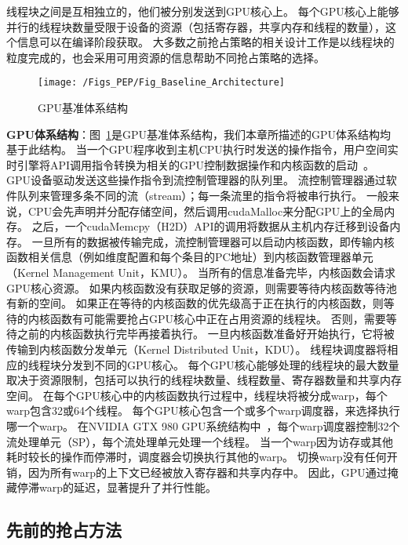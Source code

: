 线程块之间是互相独立的，他们被分别发送到GPU核心上。
每个GPU核心上能够并行的线程块数量受限于设备的资源（包括寄存器，共享内存和线程的数量），这个信息可以在编译阶段获取。
大多数之前抢占策略的相关设计工作是以线程块的粒度完成的，也会采用可用资源的信息帮助不同抢占策略的选择。


\begin{figure}[htbp] %
  \centering
  \texttt{[image: /Figs\_PEP/Fig\_Baseline\_Architecture]}
  \caption{GPU基准体系结构}
  \label{fig:Fig_Baseline_Architecture}
\end{figure}


\textbf{GPU体系结构}：图~\ref{fig:Fig_Baseline_Architecture}是GPU基准体系结构，我们本章所描述的GPU体系结构均基于此结构。
当一个GPU程序收到主机CPU执行时发送的操作指令，用户空间实时引擎将API调用指令转换为相关的GPU控制数据操作和内核函数的启动~。
GPU设备驱动发送这些操作指令到流控制管理器的队列里。
流控制管理器通过软件队列来管理多条不同的流（stream）；每一条流里的指令将被串行执行。
一般来说，CPU会先声明并分配存储空间，然后调用cudaMalloc来分配GPU上的全局内存。
之后，一个cudaMemcpy（H2D）API的调用将数据从主机内存迁移到设备内存。
一旦所有的数据被传输完成，流控制管理器可以启动内核函数，即传输内核函数相关信息（例如维度配置和每个条目的PC地址）到内核函数管理器单元（Kernel Management Unit，KMU）。
当所有的信息准备完毕，内核函数会请求GPU核心资源。
如果内核函数没有获取足够的资源，则需要等待内核函数等待池有新的空间。
如果正在等待的内核函数的优先级高于正在执行的内核函数，则等待的内核函数有可能需要抢占GPU核心中正在占用资源的线程块。
否则，需要等待之前的内核函数执行完毕再接着执行。
一旦内核函数准备好开始执行，它将被传输到内核函数分发单元（Kernel Distributed Unit，KDU）。
线程块调度器将相应的线程块分发到不同的GPU核心。
每个GPU核心能够处理的线程块的最大数量取决于资源限制，包括可以执行的线程块数量、线程数量、寄存器数量和共享内存空间。
在每个GPU核心中的内核函数执行过程中，线程块将被分成warp，每个warp包含32或64个线程。
每个GPU核心包含一个或多个warp调度器，来选择执行哪一个warp。
在NVIDIA GTX 980 GPU系统结构中~，每个warp调度器控制32个流处理单元（SP），每个流处理单元处理一个线程。
当一个warp因为访存或其他耗时较长的操作而停滞时，调度器会切换执行其他的warp。
切换warp没有任何开销，因为所有warp的上下文已经被放入寄存器和共享内存中。
因此，GPU通过掩藏停滞warp的延迟，显著提升了并行性能。

\subsection{先前的抢占方法}

